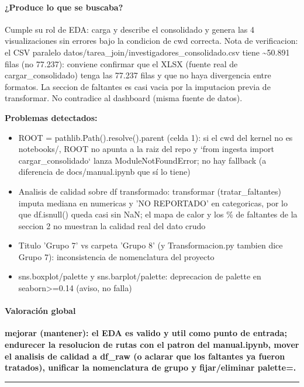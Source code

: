 \paragraph{¿Produce lo que se buscaba?}
Cumple su rol de EDA: carga y describe el consolidado y genera las 4 visualizaciones sin errores bajo la condicion de cwd correcta. Nota de verificacion: el CSV paralelo datos/tarea\_join/investigadores\_consolidado.csv tiene \textasciitilde{}50.891 filas (no 77.237): conviene confirmar que el XLSX (fuente real de cargar\_consolidado) tenga las 77.237 filas y que no haya divergencia entre formatos. La seccion de faltantes es casi vacia por la imputacion previa de transformar. No contradice al dashboard (misma fuente de datos).

\begin{tcolorbox}[riesgo]
\textbf{Problemas detectados:}
\begin{itemize}
  \item ROOT = pathlib.Path().resolve().parent (celda 1): si el cwd del kernel no es notebooks/, ROOT no apunta a la raiz del repo y `from ingesta import cargar\_consolidado` lanza ModuleNotFoundError; no hay fallback (a diferencia de docs/manual.ipynb que sí lo tiene)
  \item Analisis de calidad sobre df transformado: transformar (tratar\_faltantes) imputa mediana en numericas y 'NO REPORTADO' en categoricas, por lo que df.isnull() queda casi sin NaN; el mapa de calor y los \% de faltantes de la seccion 2 no muestran la calidad real del dato crudo
  \item Titulo 'Grupo 7' vs carpeta 'Grupo 8' (y Transformacion.py tambien dice Grupo 7): inconsistencia de nomenclatura del proyecto
  \item sns.boxplot/palette y sns.barplot/palette: deprecacion de palette en seaborn>=0.14 (aviso, no falla)
\end{itemize}
\end{tcolorbox}

\paragraph{Valoración global}
\textbf{mejorar (mantener): el EDA es valido y util como punto de entrada; endurecer la resolucion de rutas con el patron del manual.ipynb, mover el analisis de calidad a df\_raw (o aclarar que los faltantes ya fueron tratados), unificar la nomenclatura de grupo y fijar/eliminar palette=.}

\medskip
\hrule

